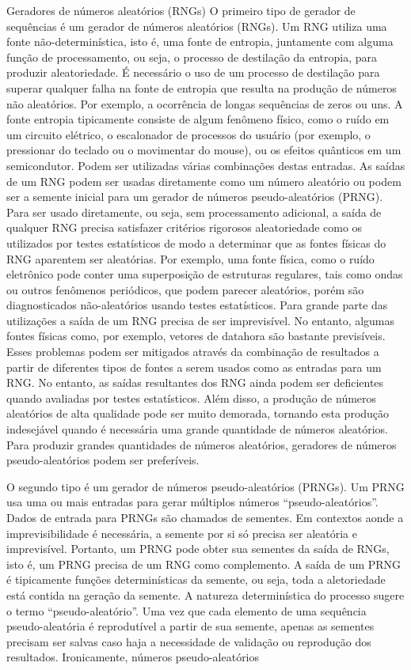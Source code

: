 Geradores de números aleatórios (RNGs)
O primeiro tipo de gerador de sequências é um gerador de números aleatórios (RNGs). Um RNG utiliza uma fonte não-determinística, isto é, uma fonte de entropia, juntamente com alguma função de processamento, ou seja, o processo de destilação da entropia, para produzir aleatoriedade. É necessário o uso de um processo de destilação para superar qualquer falha na fonte de entropia que resulta na produção de números não aleatórios. Por exemplo, a ocorrência de longas sequências de zeros ou uns. A fonte entropia tipicamente consiste de algum fenômeno físico, como o ruído em um circuito elétrico, o escalonador de processos do usuário (por exemplo, o pressionar do teclado ou o movimentar do mouse), ou os efeitos quânticos em um semicondutor. Podem ser utilizadas várias combinações destas entradas. As saídas de um RNG podem ser usadas diretamente como um número aleatório ou podem ser a semente inicial para um gerador de números pseudo-aleatórios (PRNG). Para ser usado diretamente, ou seja, sem processamento adicional, a saída de qualquer RNG precisa satisfazer critérios rigorosos aleatoriedade como os utilizados por testes estatísticos de modo a determinar que as fontes físicas do RNG aparentem ser aleatórias. Por exemplo, uma fonte física, como o ruído eletrônico pode conter uma superposição de estruturas regulares, tais como ondas ou outros fenômenos periódicos, que podem parecer aleatórios, porém são diagnosticados não-aleatórios usando testes estatísticos. Para grande parte das utilizações a saída de um RNG precisa de ser imprevisível. No entanto, algumas fontes físicas como, por exemplo, vetores de data\/hora são bastante previsíveis. Esses problemas podem ser mitigados através da combinação de resultados a partir de diferentes tipos de fontes a serem usados como as entradas para um RNG. No entanto, as saídas resultantes dos RNG ainda podem ser deficientes quando avaliadas por testes estatísticos. Além disso, a produção de números aleatórios de alta qualidade pode ser muito demorada, tornando esta produção indesejável quando é necessária uma grande quantidade de números aleatórios. Para produzir grandes quantidades de números aleatórios, geradores de números pseudo-aleatórios podem ser preferíveis.

O segundo tipo é um gerador de números pseudo-aleatórios (PRNGs). Um PRNG usa uma ou mais entradas para gerar múltiplos números ``pseudo-aleatórios''. Dados de entrada para PRNGs são chamados de sementes. Em contextos aonde a imprevisibilidade é necessária, a semente por si só precisa ser aleatória e imprevisível. Portanto, um PRNG pode obter sua sementes da saída de RNGs, isto é, um PRNG precisa de um RNG como complemento. A saída de um PRNG é tipicamente funções determinísticas da semente, ou seja, toda a aletoriedade está contida na geração da semente. A natureza determinística do processo sugere o termo ``pseudo-aleatório''. Uma vez que cada elemento de uma sequência pseudo-aleatória é reprodutível a partir de sua semente, apenas as sementes precisam ser salvas caso haja a necessidade de validação ou reprodução dos resultados. Ironicamente, números pseudo-aleatórios

